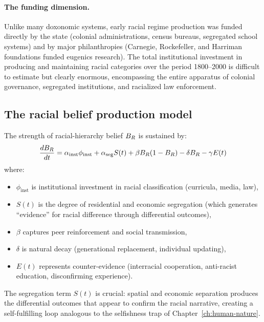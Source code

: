 \paragraph{The funding dimension.}
Unlike many doxonomic systems, early racial regime production was funded directly by the state (colonial administrations, census bureaus, segregated school systems) and by major philanthropies (Carnegie, Rockefeller, and Harriman foundations funded eugenics research).
The total institutional investment in producing and maintaining racial categories over the period 1800--2000 is difficult to estimate but clearly enormous, encompassing the entire apparatus of colonial governance, segregated institutions, and racialized law enforcement.

\subsection{The racial belief production model}

\begin{model}
\label{mod:racial-production}
The strength of racial-hierarchy belief $B_{R}$ is sustained by:
\[
  \frac{dB_{R}}{dt} = \alpha_{\text{inst}} \phi_{\text{inst}} + \alpha_{\text{seg}} S(t) + \beta B_{R}(1-B_{R}) - \delta B_{R} - \gamma E(t)
\]
where:
\begin{itemize}[nosep]
  \item $\phi_{\text{inst}}$ is institutional investment in racial classification (curricula, media, law),
  \item $S(t)$ is the degree of residential and economic segregation (which generates ``evidence'' for racial difference through differential outcomes),
  \item $\beta$ captures peer reinforcement and social transmission,
  \item $\delta$ is natural decay (generational replacement, individual updating),
  \item $E(t)$ represents counter-evidence (interracial cooperation, anti-racist education, disconfirming experience).
\end{itemize}
\end{model}

The segregation term $S(t)$ is crucial: spatial and economic separation produces the differential outcomes that appear to confirm the racial narrative, creating a self-fulfilling loop analogous to the selfishness trap of Chapter~\ref{ch:human-nature}.

